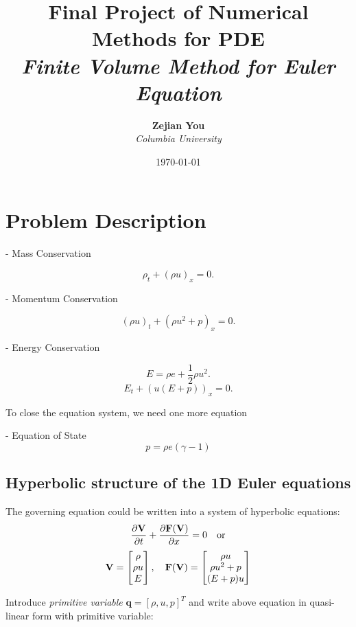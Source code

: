 \documentclass[11pt]{diazessay} %
\title{\textbf{Final Project of Numerical Methods for PDE} \\ {\Large\itshape Finite Volume Method for Euler Equation}} %
\author{\textbf{Zejian You} \\ \textit{Columbia University}} %
\date{\today} %
\begin{document}
\maketitle %


\section{Problem Description}

- Mass Conservation
  
$$\rho_t + (\rho u)_x = 0.$$

- Momentum Conservation

$$(\rho u)_t + (\rho u^2 + p)_x = 0.$$

- Energy Conservation
  
$$E = \rho e + \frac{1}{2}\rho u^2.$$
$$E_t + (u(E+p))_x = 0.$$

To close the equation system, we need one more equation

- Equation of State
$$
p = \rho e(\gamma -1)
$$

\subsection{Hyperbolic structure of the 1D Euler equations}
The governing equation could be written into a system of hyperbolic equations:
$$
    \frac{\partial \bf{V}}{\partial t} + \frac{\partial \bf{F}(\bf{V})}{\partial x} =0 \quad \text{or}
$$
$$
    \bf{V} = \begin{bmatrix}
        \rho \\ \rho u\\ E
    \end{bmatrix}, \quad \bf{F}(\bf{V})=\begin{bmatrix}
        \rho u \\\rho u^2 + p\\(E + p) u
    \end{bmatrix}
$$


Introduce \textit{primitive variable} $\textbf{q} = [\rho, u, p]^{T}$ and write above equation in quasi-linear form with primitive variable:
\end{document}
